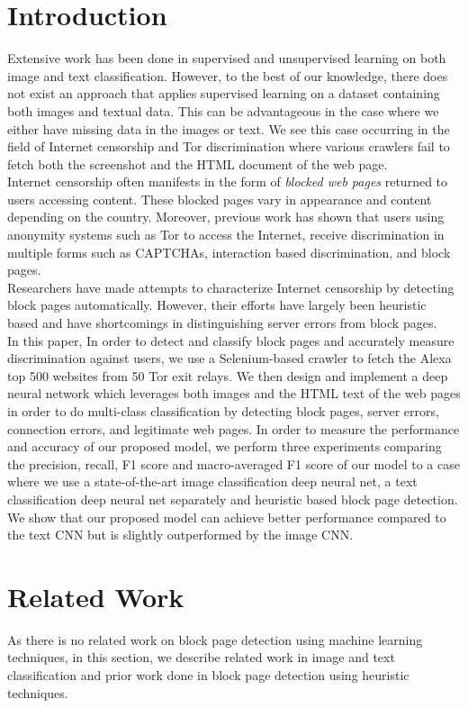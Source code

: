 \documentclass{article} %
\begin{document}
\section{Introduction}
Extensive work has been done in supervised and unsupervised learning on both image and text classification. However, to the best of our knowledge, there does not exist an approach that applies supervised learning on a dataset containing both images and textual data. This can be advantageous in the case where we either have missing data in the images or text. We see this case occurring in the field of Internet censorship and Tor discrimination where various crawlers fail to fetch both the screenshot and the HTML document of the web page.\\
Internet censorship often manifests in the form of \emph{blocked web pages} returned to users accessing content. These blocked pages vary in appearance and content depending on the country. 
Moreover, previous work has shown that users using anonymity systems such as Tor to access the Internet, receive discrimination in multiple forms such as CAPTCHAs, interaction based discrimination, and block pages. \\
Researchers have made attempts to characterize Internet censorship by detecting block pages automatically. However, their efforts have largely been heuristic based and have shortcomings in distinguishing server errors from block pages.\\
In this paper, In order to detect and classify block pages and accurately measure discrimination against users, we use a Selenium-based crawler to fetch the Alexa top 500 websites from 50 Tor exit relays. We then design and implement a deep neural network which leverages both images and the HTML text of the web pages in order to do multi-class classification by detecting block pages, server errors, connection errors, and legitimate web pages. In order to measure the performance and accuracy of our proposed model, we perform three experiments comparing the precision, recall, F1 score and macro-averaged F1 score of our model to a case where we use a state-of-the-art image classification deep neural net, a text classification deep neural net separately and heuristic based block page detection. We show that our proposed model can achieve better performance compared to the text CNN but is slightly outperformed by the image CNN. 
\section{Related Work}
As there is no related work on block page detection using machine learning techniques, in this section, we describe related work in image and text classification and prior work done in block page detection using heuristic techniques.
\end{document}
